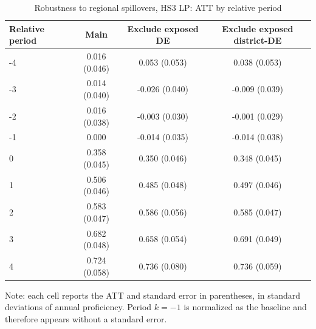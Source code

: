 ﻿\begin{table}[!htbp]
\centering
\caption{Robustness to regional spillovers, HS3 LP: ATT by relative period}
\label{tab:ap_event_spillover_HS3_lp}
\vspace{-0.15cm}
\scriptsize
\setlength{\tabcolsep}{4pt}
\renewcommand{\arraystretch}{0.92}
\begin{tabular}{lccc}
\toprule
Relative period & Main & Exclude exposed DE & Exclude exposed district-DE \\
\midrule
-4 & 0.016 (0.046) & 0.053 (0.053) & 0.038 (0.053) \\
-3 & 0.014 (0.040) & -0.026 (0.040) & -0.009 (0.039) \\
-2 & 0.016 (0.038) & -0.003 (0.030) & -0.001 (0.029) \\
-1 & 0.000 & -0.014 (0.035) & -0.014 (0.038) \\
0 & 0.358 (0.045) & 0.350 (0.046) & 0.348 (0.045) \\
1 & 0.506 (0.046) & 0.485 (0.048) & 0.497 (0.046) \\
2 & 0.583 (0.047) & 0.586 (0.056) & 0.585 (0.047) \\
3 & 0.682 (0.048) & 0.658 (0.054) & 0.691 (0.049) \\
4 & 0.724 (0.058) & 0.736 (0.080) & 0.736 (0.059) \\
\bottomrule
\end{tabular}
\begin{flushleft}
\footnotesize Note: each cell reports the ATT and standard error in parentheses, in standard deviations of annual proficiency. Period \(k=-1\) is normalized as the baseline and therefore appears without a standard error.
\end{flushleft}
\end{table}



